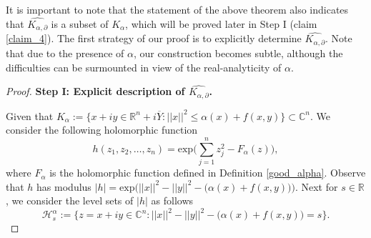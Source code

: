 \documentclass[12pt,reqno, a4paper]{amsart}
\theoremstyle{definition}
\theoremstyle{definition}
\numberwithin{equation}{section}
\def\R{\mathbb{R}}                              %
\def\C{\mathbb{C}}                              %
\begin{document}
It is important to note that the statement of the above theorem also indicates that $\widehat{K_{\alpha,\partial}}$ is a subset of $K_\alpha$, which will be proved later in Step I (claim \ref{claim_4}).
The first strategy of our proof is to explicitly determine $\widehat{K_{\alpha,\partial}}$. Note that due to the presence of $\alpha$, our construction becomes subtle, although the difficulties can be surmounted in view of the real-analyticity of $\alpha.$	
\begin{proof} 
\textbf{Step I: Explicit description of $\widehat{K_{\alpha,\partial}}$.} \\

\vspace*{-.3cm} 
 
Given that $K_{\alpha} := \{x+iy \in \R^n+i \overline{Y} : ||x||^2\leq \alpha(x)+f(x,y)\}\subset \C^n.$
 We consider the following holomorphic function $$h(z_1,z_2,\ldots, z_n)=\text{exp}{\Big(\sum_{j=1}^{n}z_j^2-F_{\alpha}(z)\Big)},$$ where $F_{\alpha}$ is the holomorphic function defined in Definition \ref{good_alpha}. Observe that $h$ has modulus $|h|=\text{exp}\big({||x||^2-||y||^2-\big(\alpha(x)+f(x,y)\big)}\big)$.  
 Next for $s\in \R$, we consider the level sets of $|h|$ as follows $$\mathcal{H}_{s}^{\alpha}:=\{z=x+iy\in\C^{n}:||x||^2-||y||^2-\big(\alpha(x)+f(x,y)\big)=s\}.$$ 


\end{proof}
\end{document}

